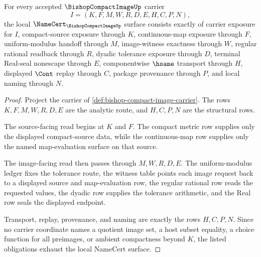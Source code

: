\begin{theorem}
\label{thm:bishop-compact-image-namecert-obligations}
For every accepted $\BishopCompactImageUp$ carrier
$$
I=(K,F,M,W,R,D,E,H,C,P,N),
$$
the local $\NameCert_{\BishopCompactImageUp}$ surface consists exactly of carrier exposure for $I$, compact-source exposure through $K$, continuous-map exposure through $F$, uniform-modulus handoff through $M$, image-witness exactness through $W$, regular rational readback through $R$, dyadic tolerance exposure through $D$, terminal Real-seal nonescape through $E$, componentwise $\hsame$ transport through $H$, displayed $\Cont$ replay through $C$, package provenance through $P$, and local naming through $N$.
\end{theorem}
\begin{proof}
Project the carrier of \autoref{def:bishop-compact-image-carrier}. The rows $K,F,M,W,R,D,E$ are the analytic route, and $H,C,P,N$ are the structural rows.

The source-facing read begins at $K$ and $F$. The compact metric row supplies only the displayed compact-source data, while the continuous-map row supplies only the named map-evaluation surface on that source.

The image-facing read then passes through $M,W,R,D,E$. The uniform-modulus ledger fixes the tolerance route, the witness table points each image request back to a displayed source and map-evaluation row, the regular rational row reads the requested values, the dyadic row supplies the tolerance arithmetic, and the Real row seals the displayed endpoint.

Transport, replay, provenance, and naming are exactly the rows $H,C,P,N$. Since no carrier coordinate names a quotient image set, a host subset equality, a choice function for all preimages, or ambient compactness beyond $K$, the listed obligations exhaust the local NameCert surface.
\end{proof}


